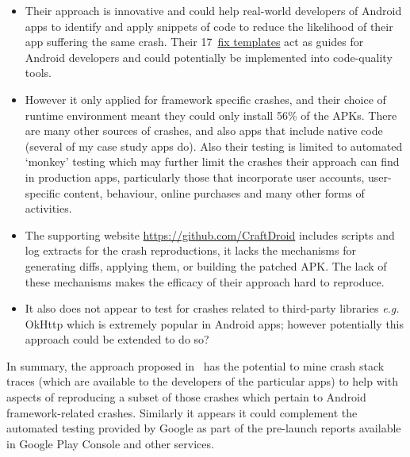 \begin{itemize}
    \item Their approach is innovative and could help real-world developers of Android apps to identify and apply snippets of code to reduce the likelihood of their app suffering the same crash. Their 17~\href{https://github.com/CraftDroid/ExpData/tree/master/Fix_Templates}{fix templates} act as guides for Android developers and could potentially be implemented into code-quality tools.
    \item However it only applied for framework specific crashes, and their choice of runtime environment meant they could only install 56\% of the APKs. There are many other sources of crashes, and also apps that include native code (several of my case study apps do). Also their testing is limited to automated `monkey' testing which may further limit the crashes their approach can find in production apps, particularly those that incorporate user accounts, user-specific content, behaviour, online purchases and many other forms of activities.
    \item The supporting website \url{https://github.com/CraftDroid} includes scripts and log extracts for the crash reproductions, it lacks the mechanisms for generating diffs, applying them, or building the patched APK. The lack of these mechanisms makes the efficacy of their approach hard to reproduce.
    \item It also does not appear to test for crashes related to third-party libraries \emph{e.g.} OkHttp which is extremely popular in Android apps; however potentially this approach could be extended to do so?
\end{itemize}

In summary, the approach proposed in~ has the potential to mine crash stack traces (which are available to the developers of the particular apps) to help with aspects of reproducing a subset of those crashes which pertain to Android framework-related crashes. Similarly it appears it could complement the automated testing provided by Google as part of the pre-launch reports available in Google Play Console and other services. 

